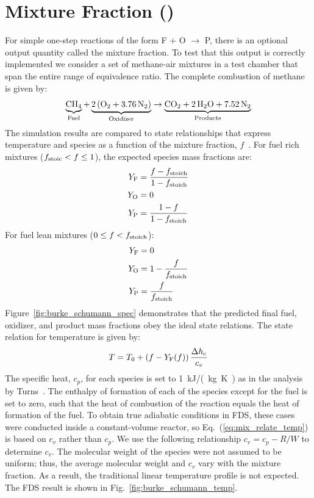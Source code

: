 \documentclass[11pt]{book}
\begin{document}
\clearpage

\section{Mixture Fraction ()}
\label{Mix_Frac}
\label{burke_schumann_spec}
\label{burke_schumann_temp}

For simple one-step reactions of the form F + O $\rightarrow$ P, there is an optional output quantity called the mixture fraction. To test that this output is correctly implemented we consider a set of methane-air mixtures in a test chamber that span the entire range of equivalence ratio. The complete combustion of methane is given by:
\begin{equation}\label{eq:methane_ex2}
\underbrace{\mathrm{CH_4}}_{\rm Fuel} + \underbrace{\mathrm{2\,(O_2 + 3.76\,N_2)}}_{\rm Oxidizer} \rightarrow  \underbrace{\mathrm{CO_2 + 2\, H_2O + 7.52\,N_2}}_{\rm Products}
\end{equation}
The simulation results are compared to state relationships that express temperature and species as a function of the mixture fraction, $f$~\cite{Turns:1996}. For fuel rich mixtures ($f_{\rm stoic} < f \le 1$), the expected species mass fractions are:
\begin{align}\label{eq:mix_relate_rich}
Y_{\rm F} &= \frac{f-f_{\rm stoich}}{1-f_{\rm stoich}} \\
Y_{\rm O} &= 0 \\
Y_{\rm P} &= \frac{1-f}{1-f_{\rm stoich}}
\end{align}
For fuel lean mixtures ($0 \le f < f_{\rm stoich}$):
\begin{align}\label{eq:mix_relate_lean}
Y_{\rm F} &= 0 \\
Y_{\rm O} &= 1- \frac{f}{f_{\rm stoich}} \\
Y_{\rm P} &= \frac{f}{f_{\rm stoich}}
\end{align}
Figure~\ref{fig:burke_schumann_spec} demonstrates that the predicted final fuel, oxidizer, and product mass fractions obey the ideal state relations. The state relation for temperature is given by:
\begin{equation}\label{eq:mix_relate_temp}
T = T_0 +  (f-Y_{\rm F}(f)) \, \frac{\Delta h_{\rm c}}{c_{v}}
\end{equation}
The specific heat, $c_p$, for each species is set to 1~\si{kJ/(kg.K)} as in the analysis by Turns~\cite{Turns:1996}. The enthalpy of formation of each of the species except for the fuel is set to zero, such that the heat of combustion of the reaction equals the heat of formation of the fuel. To obtain true adiabatic conditions in FDS, these cases were conducted inside a constant-volume reactor, so Eq.~(\ref{eq:mix_relate_temp}) is based on $c_v$ rather than $c_p$. We use the  following relationship $c_v = c_p - R/W$ to determine $c_v$. The molecular weight of the species were not assumed to be uniform; thus, the average molecular weight and $c_v$ vary with the mixture fraction. As a result, the traditional linear temperature profile is not expected.  The FDS result is shown in Fig.~\ref{fig:burke_schumann_temp}.
\end{document}
